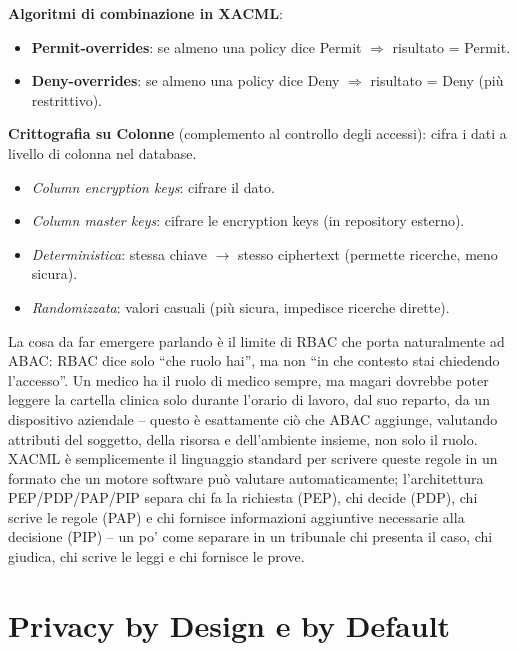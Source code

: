 \documentclass[a4paper,11pt]{article}
\begin{document}
\textbf{Algoritmi di combinazione in XACML}:
\begin{itemize}
  \item \textbf{Permit-overrides}: se almeno una policy dice Permit $\Rightarrow$ risultato = Permit.
  \item \textbf{Deny-overrides}: se almeno una policy dice Deny $\Rightarrow$ risultato = Deny (pi\`{u} restrittivo).
\end{itemize}

\textbf{Crittografia su Colonne} (complemento al controllo degli accessi): cifra i dati a livello di colonna nel database.
\begin{itemize}
  \item \emph{Column encryption keys}: cifrare il dato.
  \item \emph{Column master keys}: cifrare le encryption keys (in repository esterno).
  \item \emph{Deterministica}: stessa chiave $\to$ stesso ciphertext (permette ricerche, meno sicura).
  \item \emph{Randomizzata}: valori casuali (pi\`{u} sicura, impedisce ricerche dirette).
\end{itemize}

\begin{nota}
La cosa da far emergere parlando \`{e} il limite di RBAC che porta naturalmente ad ABAC: RBAC dice solo ``che ruolo hai'', ma non ``in che contesto stai chiedendo l'accesso''. Un medico ha il ruolo di medico sempre, ma magari dovrebbe poter leggere la cartella clinica solo durante l'orario di lavoro, dal suo reparto, da un dispositivo aziendale -- questo \`{e} esattamente ci\`{o} che ABAC aggiunge, valutando attributi del soggetto, della risorsa e dell'ambiente insieme, non solo il ruolo. XACML \`{e} semplicemente il linguaggio standard per scrivere queste regole in un formato che un motore software pu\`{o} valutare automaticamente; l'architettura PEP/PDP/PAP/PIP separa chi fa la richiesta (PEP), chi decide (PDP), chi scrive le regole (PAP) e chi fornisce informazioni aggiuntive necessarie alla decisione (PIP) -- un po' come separare in un tribunale chi presenta il caso, chi giudica, chi scrive le leggi e chi fornisce le prove.
\end{nota}

\section{Privacy by Design e by Default}
\end{document}
